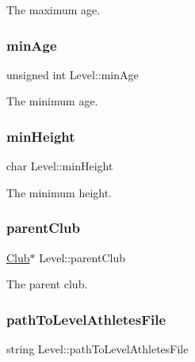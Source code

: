 The maximum age. 

\hypertarget{class_level_a3ab82616194caca77f24c568c4151a19}{}\label{class_level_a3ab82616194caca77f24c568c4151a19} 
\subsubsection{\texorpdfstring{min\+Age}{minAge}}
{\footnotesize\ttfamily unsigned int Level\+::min\+Age\hspace{0.3cm}{\ttfamily [private]}}



The minimum age. 

\hypertarget{class_level_a94edfb0b68503e60c1d79163c2cc1861}{}\label{class_level_a94edfb0b68503e60c1d79163c2cc1861} 
\subsubsection{\texorpdfstring{min\+Height}{minHeight}}
{\footnotesize\ttfamily char Level\+::min\+Height\hspace{0.3cm}{\ttfamily [private]}}



The minimum height. 

\hypertarget{class_level_a383670d611a12c518ef48ce9fa179f7a}{}\label{class_level_a383670d611a12c518ef48ce9fa179f7a} 
\subsubsection{\texorpdfstring{parent\+Club}{parentClub}}
{\footnotesize\ttfamily \hyperlink{class_club}{Club}$\ast$ Level\+::parent\+Club\hspace{0.3cm}{\ttfamily [private]}}



The parent club. 

\hypertarget{class_level_a657f004e4174828d48b1a7014536fa50}{}\label{class_level_a657f004e4174828d48b1a7014536fa50} 
\subsubsection{\texorpdfstring{path\+To\+Level\+Athletes\+File}{pathToLevelAthletesFile}}
{\footnotesize\ttfamily string Level\+::path\+To\+Level\+Athletes\+File\hspace{0.3cm}{\ttfamily [private]}}



